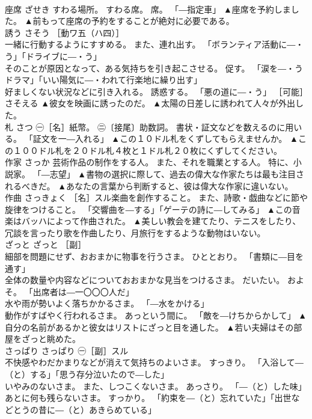 \documentclass[8pt]{extreport}
\begin{document}
\begin{CJK}{UTF8}{min}
\\	座席	ざせき	すわる場所。 すわる席。 席。 「―指定車」	▲座席を予約しました。 ▲前もって座席の予約をすることが絶対に必要である。
\\	誘う	さそう	［動ワ五（ハ四）］ 
\\	一緒に行動するようにすすめる。 また、連れ出す。 「ボランティア活動に―・う」「ドライブに―・う」 
\\	そのことが原因となって、ある気持ちを引き起こさせる。 促す。 「涙を―・うドラマ」「いい陽気に―・われて行楽地に繰り出す」 
\\	好ましくない状況などに引き入れる。 誘惑する。 「悪の道に―・う」 ［可能］さそえる	▲彼女を映画に誘ったのだ。 ▲太陽の日差しに誘われて人々が外出した。
\\	札	さつ	㊀［名］紙幣。 ㊁〔接尾〕助数詞。 書状・証文などを数えるのに用いる。 「証文を一―入れる」	▲この１０ドル札をくずしてもらえませんか。 ▲この１００ドル札を２０ドル札４枚と１ドル札２０枚にくずしてください。
\\	作家	さっか	芸術作品の制作をする人。 また、それを職業とする人。 特に、小説家。 「―志望」	▲書物の選択に際して、過去の偉大な作家たちは最も注目されるべきだ。 ▲あなたの言葉から判断すると、彼は偉大な作家に違いない。
\\	作曲	さっきょく	［名］スル楽曲を創作すること。 また、詩歌・戯曲などに節や旋律をつけること。 「交響曲を―する」「ゲーテの詩に―してみる」	▲この音楽はバッハによって作曲された。 ▲美しい教会を建てたり、テニスをしたり、冗談を言ったり歌を作曲したり、月旅行をするような動物はいない。
\\	ざっと	ざっと	［副］ 
\\	細部を問題にせず、おおまかに物事を行うさま。 ひととおり。 「書類に―目を通す」 
\\	全体の数量や内容などについておおまかな見当をつけるさま。 だいたい。 およそ。 「出席者は―一〇〇〇人だ」 
\\	水や雨が勢いよく落ちかかるさま。 「―水をかける」 
\\	動作がすばやく行われるさま。 あっという間に。 「敵を―けちからかして」	▲自分の名前があるかと彼女はリストにざっと目を通した。 ▲若い夫婦はその部屋をざっと眺めた。
\\	さっぱり	さっぱり	㊀［副］スル　 
\\	不快感やわだかまりなどが消えて気持ちのよいさま。 すっきり。 「入浴して―（と）する」「思う存分泣いたので―した」 
\\	いやみのないさま。 また、しつこくないさま。 あっさり。 「―（と）した味」 
\\	あとに何も残らないさま。 すっかり。 「約束を―（と）忘れていた」「出世などとうの昔に―（と）あきらめている」 

\end{CJK}
\end{document}
